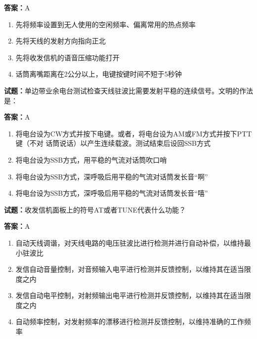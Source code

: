 \documentclass{ctexbook}
\begin{document}
\textbf{答案：}A 

\begin{enumerate}[leftmargin=3em]
  \item 先将频率设置到无人使用的空闲频率、偏离常用的热点频率 

  \item 先将天线的发射方向指向正北 

  \item 先将收发信机的语音压缩功能打开 

  \item 话筒离嘴距离在2公分以上，电键按键时间不短于5秒钟 

\end{enumerate}





\vspace{1em}

\textbf{试题：}单边带业余电台测试检查天线驻波比需要发射平稳的连续信号。文明的作法是： 


\textbf{答案：}A 

\begin{enumerate}[leftmargin=3em]
  \item 将电台设为CW方式并按下电键。或者，将电台设为AM或FM方式并按下PTT键（不对
话筒说话）以产生连续载波。测试结束后设回SSB方式 

  \item 将电台设为SSB方式，用平稳的气流对话筒吹口哨 

  \item 将电台设为SSB方式，深呼吸后用平稳的气流对话筒发长音“啊” 

  \item 将电台设为SSB方式，深呼吸后用平稳的气流对话筒发长音“嘻” 

\end{enumerate}





\vspace{1em}

\textbf{试题：}收发信机面板上的符号AT或者TUNE代表什么功能？ 

\textbf{答案：}A 

\begin{enumerate}[leftmargin=3em]
  \item 自动天线调谐，对天线电路的电压驻波比进行检测并进行自动补偿，以维持最小驻波比 

  \item 发信自动音量控制，对音频输入电平进行检测并反馈控制，以维持其在适当限度之内 

  \item 发信自动电平控制，对射频输出电平进行检测并反馈控制，以维持其在适当限度之内 

  \item 自动频率控制，对发射频率的漂移进行检测并反馈控制，以维持准确的工作频率 

\end{enumerate}
\end{document}
